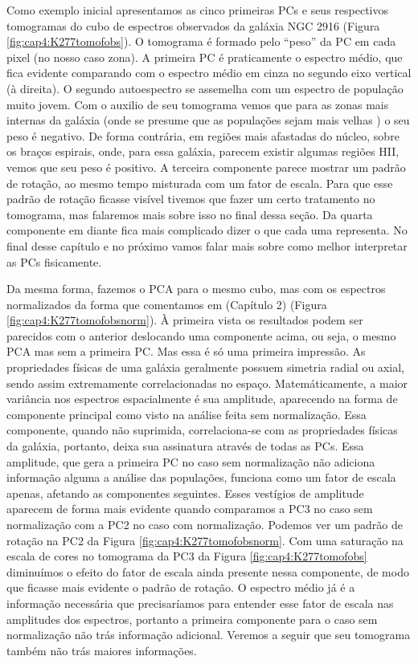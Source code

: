 Como exemplo inicial apresentamos as cinco primeiras PCs e seus respectivos tomogramas do cubo de espectros observados
da galáxia NGC 2916 (Figura \ref{fig:cap4:K277tomofobs}). O tomograma é formado pelo ``peso'' da PC em cada pixel (no
nosso caso zona). A primeira PC é praticamente o espectro médio, que fica evidente comparando com o espectro médio em
cinza no segundo eixo vertical (à direita). O segundo autoespectro se assemelha com um espectro de população muito
jovem. Com o auxilio de seu tomograma vemos que para as zonas mais internas da galáxia (onde se presume que as
populações sejam mais velhas \citneed) o seu peso é negativo. De forma contrária, em regiões mais afastadas do núcleo,
sobre os braços espirais, onde, para essa galáxia, parecem existir algumas regiões HII, vemos que seu peso é positivo. A
terceira componente parece mostrar um padrão de rotação, ao mesmo tempo misturada com um fator de escala. Para que esse
padrão de rotação ficasse visível tivemos que fazer um certo tratamento no tomograma, mas falaremos mais sobre isso no
final dessa seção. Da quarta componente em diante fica mais complicado dizer o que cada uma representa. No final desse
capítulo e no próximo vamos falar mais sobre como melhor interpretar as PCs fisicamente.

Da mesma forma, fazemos o PCA para o mesmo cubo, mas com os espectros normalizados da forma que comentamos em \fixme
(Capítulo 2) (Figura \ref{fig:cap4:K277tomofobsnorm}). À primeira vista os resultados podem ser parecidos com o anterior
deslocando uma componente acima, ou seja, o mesmo PCA mas sem a primeira PC. Mas essa é só uma primeira impressão. As
propriedades físicas de uma galáxia geralmente possuem simetria radial ou axial, sendo assim extremamente
correlacionadas no espaço. Matemáticamente, a maior variância nos espectros espacialmente é sua amplitude, aparecendo na
forma de componente principal como visto na análise feita sem normalização. Essa componente, quando não suprimida,
correlaciona-se com as propriedades físicas da galáxia, portanto, deixa sua assinatura através de todas as PCs. Essa
amplitude, que gera a primeira PC no caso sem normalização não adiciona informação alguma a análise das populações,
funciona como um fator de escala apenas, afetando as componentes seguintes. Esses vestígios de amplitude aparecem de
forma mais evidente quando comparamos a PC3 no caso sem normalização com a PC2 no caso com normalização. Podemos ver um
padrão de rotação na PC2 da Figura \ref{fig:cap4:K277tomofobsnorm}. Com uma saturação na escala de cores no tomograma da
PC3 da Figura \ref{fig:cap4:K277tomofobs} diminuímos o efeito do fator de escala ainda presente nessa componente, de
modo que ficasse mais evidente o padrão de rotação. O espectro médio já é a informação necessária que precisaríamos para
entender esse fator de escala nas amplitudes dos espectros, portanto a primeira componente para o caso sem normalização
não trás informação adicional. Veremos a seguir que seu tomograma também não trás maiores informações.

